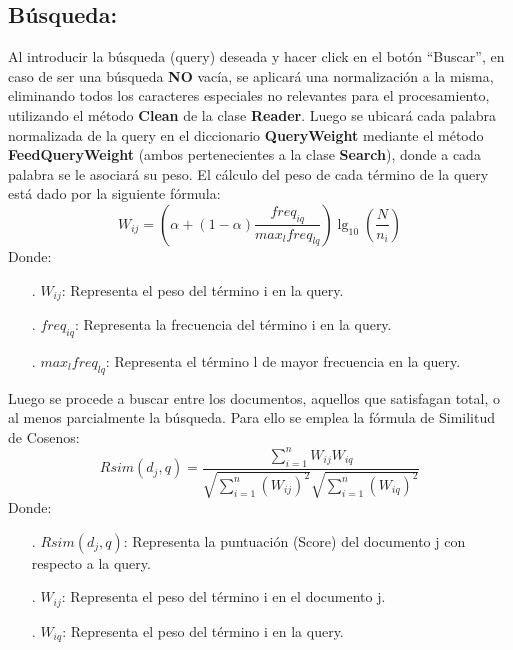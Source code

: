 \documentclass{article}
\begin{document}
\subsection{Búsqueda:}
Al introducir la búsqueda (query) deseada y hacer click en el botón “Buscar”, en caso de ser una
búsqueda \textbf{NO} vacía, se aplicará una normalización a la misma, eliminando todos los
caracteres especiales no relevantes para el procesamiento, utilizando el método \textbf{Clean} de la
clase \textbf{Reader}. Luego se ubicará cada palabra normalizada de la query en el
diccionario \textbf{QueryWeight} mediante el método \textbf{FeedQueryWeight} (ambos pertenecientes a la clase
\textbf{Search}), donde a cada palabra se le asociará su peso. El cálculo del peso de cada término de la query
está dado por la siguiente fórmula:
$$
	W_{ij}=(\alpha +(1-\alpha )\frac{freq_{iq}}{max_{l}freq_{lq}})\lg_{10}{(\frac{N}{n_{i}})}
$$
Donde:
\begin{itemize}
	\item [.]$W_{ij}$: Representa el peso del término i en la query.
	\item [.]$freq_{iq}$: Representa la frecuencia del término i en la query.
	\item [.]$max_{l}freq_{lq}$: Representa el término l de mayor frecuencia en la query.
\end{itemize}
Luego se procede a buscar entre los documentos, aquellos que satisfagan total, o al
menos parcialmente la búsqueda.
Para ello se emplea la fórmula de Similitud de Cosenos:
$$
	Rsim(d_{j},q)=\frac{\sum_{i = 1}^{n} W_{ij} W_{iq}}
	{\sqrt{\sum_{i = 1}^{n} (W_{ij})^2} \sqrt{\sum_{i = 1}^{n} (W_{iq})^2}}
$$
\newpage
Donde:
\begin{itemize}
	\item[.] $Rsim(d_{j},q)$: Representa la puntuación (Score) del documento j con respecto a la query.
	\item[.] $W_{ij}$: Representa el peso del término i en el documento j.
	\item[.] $W_{iq}$: Representa el peso del término i en la query.
\end{itemize}
\end{document}
